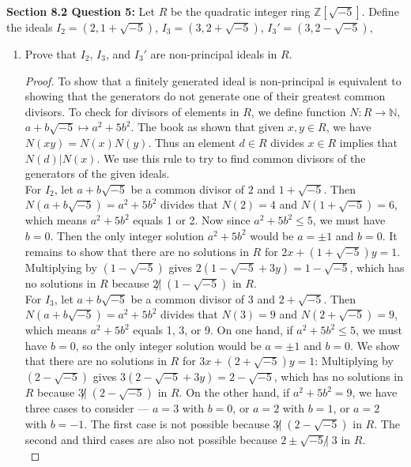 \documentclass{article}
\begin{document}
\textbf{Section 8.2 Question 5:} Let $R$ be the quadratic integer ring
  $\mathbb{Z}[\sqrt{-5}]$. Define the ideals $I_2=(2,1+\sqrt{-5})$,
  $I_3=(3,2+\sqrt{-5})$, $I_3'=(3,2-\sqrt{-5})$,
  \begin{enumerate}[label={\bf(\alph*)}]
    \item Prove that $I_2$, $I_3$, and $I_3'$ are non-principal ideals in
      $R$.
      \begin{proof}
        To show that a finitely generated ideal is non-principal is
        equivalent to showing that the generators do not generate one of
        their greatest common divisors. To check for divisors of elements
        in $R$, we define function $N:R\rightarrow\mathbb{N}$,
        $a+b\sqrt{-5}\mapsto a^2+5b^2$. The book as shown that given
        $x,y\in R$, we have $N(xy)=N(x)N(y)$. Thus an element $d\in R$
        divides $x\in R$ implies that $N(d)|N(x)$. We use this rule to try
        to find common divisors of the generators of the given ideals. \\

        For $I_2$, let $a+b\sqrt{-5}$ be a common divisor of $2$ and
        $1+\sqrt{-5}$. Then $N(a+b\sqrt{-5})=a^2+5b^2$ divides that
        $N(2)=4$ and $N(1+\sqrt{-5})=6$, which means $a^2+5b^2$ equals 1 or
        2. Now since $a^2+5b^2\leq5$, we must have $b=0$. Then the only
        integer solution $a^2+5b^2$ would be $a=\pm1$ and $b=0$. It remains
        to show that there are no solutions in $R$ for
        $2x+(1+\sqrt{-5})y=1$. Multiplying by $(1-\sqrt{-5})$ gives
        $2(1-\sqrt{-5}+3y)=1-\sqrt{-5}$, which has no solutions in $R$
        because $2\not|\; (1-\sqrt{-5})$ in $R$. \\

        For $I_3$, let $a+b\sqrt{-5}$ be a common divisor of $3$ and
        $2+\sqrt{-5}$. Then $N(a+b\sqrt{-5})=a^2+5b^2$ divides that
        $N(3)=9$ and $N(2+\sqrt{-5})=9$, which means $a^2+5b^2$ equals 1,
        3, or 9. On one hand, if $a^2+5b^2\leq5$, we must have $b=0$, so
        the only integer solution would be $a=\pm1$ and $b=0$. We show
        that there are no solutions in $R$ for $3x+(2+\sqrt{-5})y=1$:
        Multiplying by $(2-\sqrt{-5})$ gives
        $3(2-\sqrt{-5}+3y)=2-\sqrt{-5}$, which has no
        solutions in $R$ because $3\not|\; (2-\sqrt{-5})$ in $R$. On the
        other hand, if $a^2+5b^2=9$, we have three cases to consider ---
        $a=3$ with $b=0$, or $a=2$ with $b=1$, or $a=2$ with $b=-1$. The
        first case is not possible because $3\not|\; (2-\sqrt{-5})$ in $R$.
        The second and third cases are also not possible because
        $2\pm\sqrt{-5}\not|\; 3$ in $R$. \\


\end{proof}
\end{enumerate}
\end{document}
